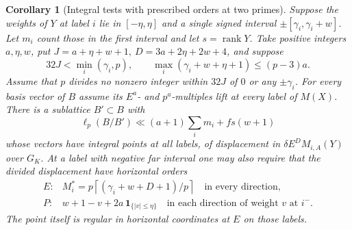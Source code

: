 \documentclass[a4paper,11pt]{article}
\newtheorem{corollary}[proposition]{Corollary}
\theoremstyle{definition}
\theoremstyle{remark}
\numberwithin{equation}{section}
\begin{document}
\begin{corollary}[Integral tests with prescribed orders at two primes]
\leavevmode\label{cor:negativejets797}
Suppose the weights of \(Y\) at label \(i\) lie in
\([-\eta,\eta]\) and a single signed interval
\(\pm[\gamma_i,\gamma_i+w]\). Let \(m_i\) count those in
the first interval and let \(s=\operatorname{rank}Y\).
Take positive integers \(a,\eta,w\), put
\(J=a+\eta+w+1,\ D=3a+2\eta+2w+4\), and suppose
\[
   32J<\min_i(\gamma_i,p),\qquad
   \max_i(\gamma_i+w+\eta+1)\le(p-3)a .
\]
Assume that \(p\) divides no nonzero integer within \(32J\)
of \(0\) or any \(\pm\gamma_i\). For every basis vector of
\(B\) assume its \(E^a\)- and \(p^a\)-multiples lift at
every label of \(M(X)\). There is a sublattice \(B'\subset B\)
with
\[
       \ell_p(B/B')\ll (a+1)\sum_i m_i + f s(w+1)
\]
whose vectors have integral points at all labels, of
displacement in \(\delta E^D M_{i,A}(Y)\) over \(G_K\).
At a label with negative far interval one may also require
that the divided displacement have horizontal orders
\[
 \begin{array}{ll}
 E: & M_i^*=p\left\lceil(\gamma_i+w+D+1)/p\right\rceil
                 \quad\text{in every direction},\\
 P: & w+1-v+2a\,\mathbf 1_{\{|v|\le\eta\}}
                 \quad\text{in each direction of weight \(v\) at \(i^-\)} .
 \end{array}
\]
The point itself is regular in horizontal coordinates at
\(E\) on those labels.
\end{corollary}
\end{document}
